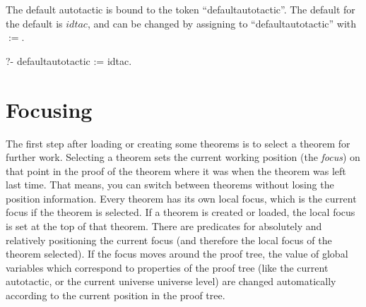 \documentclass[11pt]{report}
\makeatletter
\newcommand{\ulinv}[1]{\index{#1@\texttt{#1}}}
\makeatother
\begin{document}
 \normalsize
 \ulinv{autotactic}
 The default autotactic is bound to the token ``defaultautotactic''.
 The default for the default is $idtac$, and can be changed by
 assigning to ``defaultautotactic'' with $:=$.
\begin{sf}\begin{tabbing}
?- defaultautotactic := idtac.\\[-0.7ex]

\end{tabbing}\end{sf}

 
 \section{Focusing}
 The first step after loading or creating some theorems is to select
 a theorem for further work. Selecting a theorem sets the current 
 working position (the \emph{focus}) on that point in the proof of the
 theorem where it was when the theorem was left last time.
 That means, you can switch between theorems without losing
 the position information. Every theorem has its own
 local focus, which is the current focus if the theorem is selected.
 If a theorem is created or loaded, the local focus is set at the top
 of that theorem.
 There are predicates for absolutely and relatively positioning
 the current focus (and therefore the local focus of the theorem
 selected).
 If the focus  moves around the proof tree, the value of
 global variables which correspond to properties of the
 proof tree (like the current autotactic, or the current universe
 universe level) are changed automatically according to the current
 position in the proof tree.
\end{document}
